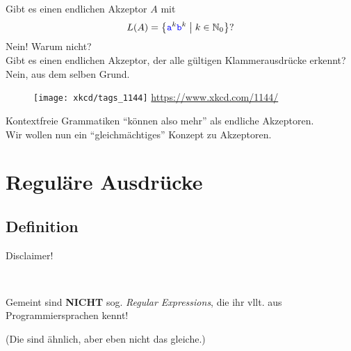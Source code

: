 
\begin{frame}[t]
	Gibt es einen endlichen Akzeptor $A$ mit $$L(A) = \left\{ \hbox{\textcolor{blue}{\texttt{a}}}^k\hbox{\textcolor{blue}{\texttt{b}}}^k \;\middle|\; k\in \mathbb{N}_0 \right\}?$$
	\pause
	Nein! Warum nicht? \\
	
	Gibt es einen endlichen Akzeptor, der alle gültigen Klammerausdrücke erkennt?\\ \pause
	Nein, aus dem selben Grund.
	\begin{figure}[H]
		\centering
		\texttt{[image: xkcd/tags\_1144]}
		{ {\url{https://www.xkcd.com/1144/}} }
	\end{figure}
	\pause
	Kontextfreie Grammatiken \enquote{können also mehr} als endliche Akzeptoren.\\
	Wir wollen nun ein \enquote{gleichmächtiges} Konzept zu Akzeptoren.
\end{frame}

\section{Reguläre Ausdrücke}
\subsection{Definition}

\begin{frame}{Disclaimer!}
	\begin{center}
		\Large
			 \\ \medskip
		
		Gemeint sind \textbf{NICHT} sog. \emph{Regular Expressions}, die ihr vllt. aus Programmiersprachen kennt! \\ \bigskip
		
		{\normalsize (Die sind ähnlich, aber eben nicht das gleiche.)}
	\end{center}
\end{frame}

